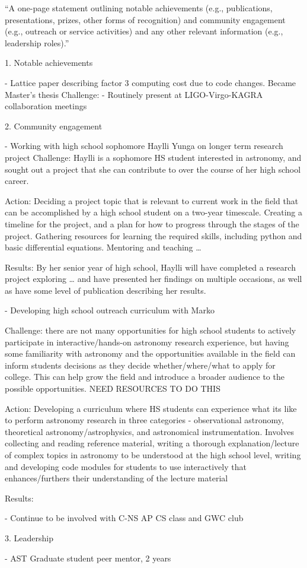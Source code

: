 \documentclass{article}
\begin{document}
``A one-page statement outlining notable achievements (e.g., publications, presentations, prizes,
other forms of recognition) and community engagement (e.g., outreach or service activities) and
any other relevant information (e.g., leadership roles).''

1. Notable achievements

- Lattice paper describing factor 3 computing cost due to code changes. Became Master's thesis
Challenge: 
- Routinely present at LIGO-Virgo-KAGRA collaboration meetings

2. Community engagement

- Working with high school sophomore Haylli Yunga on longer term research project
Challenge: Haylli is a sophomore HS student interested in astronomy, and sought out a project that she can contribute to over the course of her high school career.

Action: Deciding a project topic that is relevant to current work in the field that can be accomplished by a high school student on a two-year timescale. Creating a timeline for the project, and a plan for how to progress through the stages of the project. Gathering resources for learning the required skills, including python and basic differential equations. Mentoring and teaching \ldots

Results: By her senior year of high school, Haylli will have completed a research project exploring … and have presented her findings on multiple occasions, as well as have some level of publication describing her results.

- Developing high school outreach curriculum with Marko

Challenge: there are not many opportunities for high school students to actively participate in interactive/hands-on astronomy research experience, but having some familiarity with astronomy and the opportunities available in the field can inform students decisions as they decide whether/where/what to apply for college. This can help grow the field and introduce a broader audience to the possible opportunities. NEED RESOURCES TO DO THIS

Action: Developing a curriculum where HS students can experience what its like to perform astronomy research in three categories - observational astronomy, theoretical astronomy/astrophysics, and astronomical instrumentation. Involves collecting and reading reference material, writing a thorough explanation/lecture of complex topics in astronomy to be understood at the high school level, writing and developing code modules for students to use interactively that enhances/furthers their understanding of the lecture material

Results:

- Continue to be involved with C-NS AP CS class and GWC club

3. Leadership

- AST Graduate student peer mentor, 2 years
\end{document}
